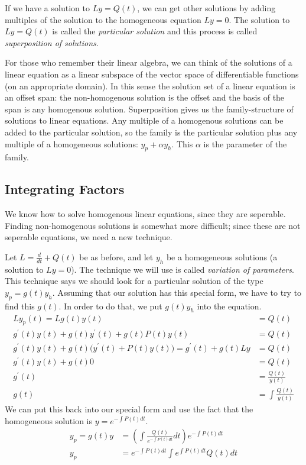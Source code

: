 \documentclass[fleqn,letterpaper]{report}
\begin{document}
\begin{defn}
If we have a solution to $Ly=Q(t)$, we can get
other solutions by adding multiples of the solution to the
homogeneous equation $Ly=0$. The solution to $Ly = Q(t)$ is
called the \emph{particular solution} and this process is called
\emph{superposition of solutions}. 
\end{defn}

For those who remember their linear algebra, we can think of
the solutions of a linear equation as a linear subspace of the
vector space of differentiable functions (on an appropriate
domain). In this sense the solution set of a linear equation
is an offset span: the non-homogenous solution is the offset
and the basis of the span is any homogenous solution.
Superposition gives us the family-structure of solutions to
linear equations.  Any multiple of a homogenous solutions can
be added to the particular solution, so the family is the
particular solution plus any multiple of a homogeneous
solutions: $y_p + \alpha y_h$. This $\alpha$ is the parameter
of the family.

\subsection{Integrating Factors}
\label{integrating-factors}

We know how to solve homogenous linear equations, since they
are seperable. Finding non-homogenous solutions is
somewhat more difficult; since these are not seperable
equations, we need a new technique. 

Let $L = \frac{d}{dt} + Q(t)$ be as before, and let
$y_h$ be a homogeneous solutions (a solution to $Ly = 0$). The
technique we will use is called \emph{variation of
parameters}. This technique says we should look for a
particular solution of the type $y_p = g(t) y_h$. Assuming
that our solution has this special form, we have to try to
find this $g(t)$. In order to do that, we put $g(t) y_h$ into
the equation.
\begin{align*}
Ly_p(t) = L g(t) y(t) & = Q(t) \\
g^\prime(t) y(t) + g(t) y^\prime(t) + g(t) P(t) y(t) & = Q(t) \\
g^\prime(t) y(t) + g(t) \Big( y^\prime(t) + P(t) y(t)
\Big) = g^\prime(t) + g(t) L y & = Q(t) \\
g^\prime(t) y(t) + g(t) 0 & = Q(t) \\
g^\prime(t) & = \frac{Q(t)}{y(t)} \\
g(t) & = \int \frac{Q(t)}{y(t)} 
\end{align*}
We can put this back into our special form and use the fact
that the homogeneous solution is $y = e^{-\int P(t)dt}$.
\begin{align*}
y_p = g(t) y & = \left( \int \frac{Q(t)}{e^{-\int P(t) dt}} dt
\right) e^{-\int
P(t) dt } \\
y_p & = e^{-\int P(t) dt} \int e^{\int P(t) dt} Q(t) dt
\end{align*}
\end{document}
